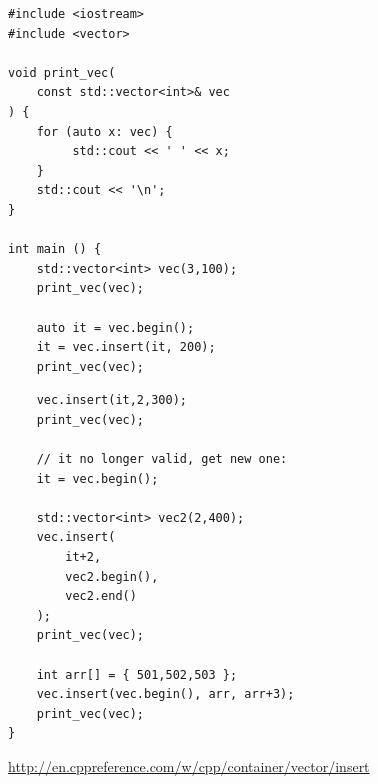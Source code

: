 \begin{frame}[fragile]
%
%
\begin{codebox}
\begin{verbatim}
#include <iostream>
#include <vector>
 
void print_vec(
    const std::vector<int>& vec
) {
    for (auto x: vec) {
         std::cout << ' ' << x;
    }
    std::cout << '\n';
}
 
int main () {
    std::vector<int> vec(3,100);
    print_vec(vec);
 
    auto it = vec.begin();
    it = vec.insert(it, 200);
    print_vec(vec);
\end{verbatim}
\end{codebox}
%	
\begin{codebox}
\begin{verbatim}
    vec.insert(it,2,300);
    print_vec(vec);
 
    // it no longer valid, get new one:
    it = vec.begin();
 
    std::vector<int> vec2(2,400);
    vec.insert(
        it+2, 
        vec2.begin(), 
        vec2.end()
    );
    print_vec(vec);
 
    int arr[] = { 501,502,503 };
    vec.insert(vec.begin(), arr, arr+3);
    print_vec(vec);
}
\end{verbatim}
\tiny \url{http://en.cppreference.com/w/cpp/container/vector/insert}
\end{codebox}
%
\end{frame}